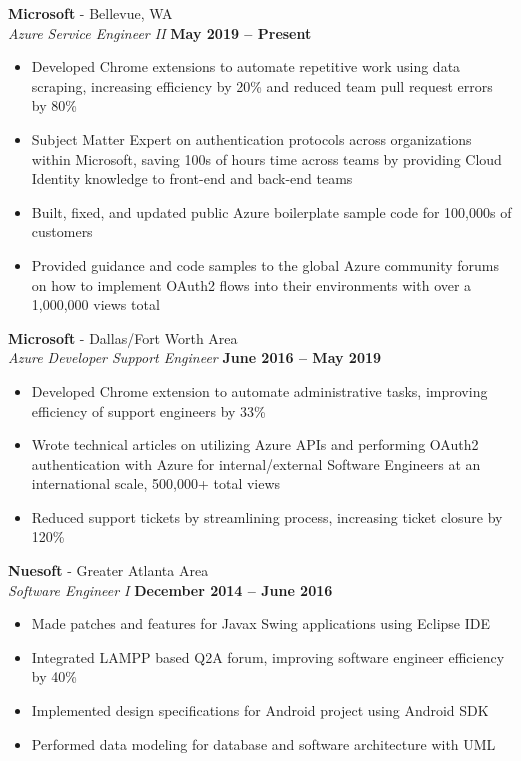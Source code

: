 \documentclass[margin,line]{resume}
\begin{document}
\begin{resume}
	\textbf{Microsoft} - Bellevue, WA \vspace{1mm}\\\vspace{1mm}
	\textsl{Azure Service Engineer II} \hfill \textbf{May 2019 -- Present}
	\begin{itemize}
		\item Developed Chrome extensions to automate repetitive work using data scraping, increasing efficiency by 20\% and reduced team pull request errors by 80\%
		\item Subject Matter Expert on authentication protocols across organizations within Microsoft, saving 100s of hours time across teams by providing Cloud Identity knowledge to front-end and back-end teams
		\item Built, fixed, and updated public Azure boilerplate sample code for 100,000s of customers
		\item Provided guidance and code samples to the global Azure community forums on how to implement OAuth2 flows into their environments with over a 1,000,000 views total 
	\end{itemize}
		
	\textbf{Microsoft} - Dallas/Fort Worth Area\vspace{1mm}\\\vspace{1mm}
	\textsl{Azure Developer Support Engineer} \hfill \textbf{June 2016 -- May 2019}
	\begin{itemize}
		 \item Developed Chrome extension to automate administrative tasks, improving efficiency of support engineers by 33\%
		 \item Wrote technical articles on utilizing Azure APIs and performing OAuth2 authentication with Azure for internal/external Software Engineers at an international scale, 500,000+ total views
		 \item Reduced support tickets by streamlining process, increasing ticket closure by 120\%
		 
	
	\end{itemize}

	\textbf{Nuesoft} - Greater Atlanta Area \vspace{1mm}\\\vspace{1mm}%
	\textsl{Software Engineer I} \hfill \textbf{December 2014 -- June 2016}
	\begin{itemize}
	 	\item Made patches and features for Javax Swing applications using Eclipse IDE 
	 	\item Integrated LAMPP based Q2A forum, improving software engineer efficiency by 40\%
	 	\item Implemented design specifications for Android project using Android SDK
	 	\item Performed data modeling for database and software architecture with UML 
	\end{itemize}


\end{resume}
\end{document}
